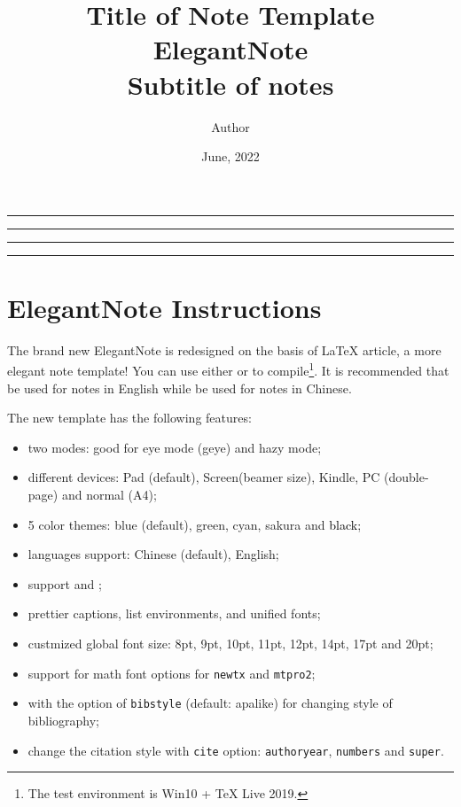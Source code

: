 \documentclass[en,normal,12pt,blue]{elegantnote}
\title{Title of Note Template ElegantNote \\[20pt]
\Large Subtitle of notes
}
\author{Author}
\date{June, 2022}
\makeatletter
\renewcommand*{\maketitle}{
\begin{titlepage}
  \pdfbookmark[1]{Cover}{cover}
  \centering
  \vspace*{5\baselineskip}
  \color{ecolor}

  \rule{\textwidth}{1.6pt}\vspace*{-\baselineskip}\vspace*{2pt}
  \rule{\textwidth}{0.4pt}

  \vspace{0.75\baselineskip}

  {\LARGE\bfseries \@title}

  \vspace{0.75\baselineskip}

  \rule{\textwidth}{0.4pt}\vspace*{-\baselineskip}\vspace{3.2pt}
  \rule{\textwidth}{1.6pt}

  \vspace{4\baselineskip}

  {\Large \@author}

  \vspace{0.35\baselineskip}	

  {\Large \@date}
	\vfill
\end{titlepage}
}
\makeatother
\begin{document}
\maketitle







\clearpage
{}
\tableofcontents
\clearpage






\section{ElegantNote Instructions}
\thispagestyle{empty}
The brand new ElegantNote is redesigned on the basis of \LaTeX{} article, a more elegant note template! You can use either  or  to compile\footnote{The test environment is Win10 + \TeX{} Live 2019.}. It is recommended that  be used for notes in English while  be used for notes in Chinese.

The new template has the following features:
\begin{itemize}
  \item two modes: good for eye mode (geye) and hazy mode;
  \item different devices: Pad (default), Screen(beamer size), Kindle, PC (double-page) and normal (A4);
  \item 5 color themes: \textcolor{eblue}{blue} (default),  \textcolor{egreen}{green}, \textcolor{ecyan}{cyan}, \textcolor{sakura}{sakura} and \textcolor{black}{black};
  \item languages support: Chinese (default), English;
  \item support  and ;
  \item prettier captions, list environments, and unified fonts;
  \item custmized global font size: 8pt, 9pt, 10pt, 11pt, 12pt, 14pt, 17pt and 20pt;
  \item support for math font options for \lstinline{newtx} and \lstinline{mtpro2};
  \item with the option of \lstinline{bibstyle} (default: apalike) for changing style of bibliography;
  \item change the citation style with \lstinline{cite} option: \lstinline{authoryear}, \lstinline{numbers} and \lstinline{super}.
\end{itemize}
\end{document}
